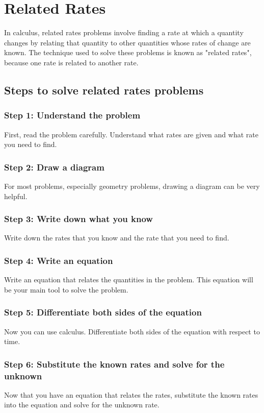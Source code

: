 \chapter{Related Rates}

In calculus, related rates problems involve finding a rate at which a quantity changes by relating that quantity to other quantities whose rates of change are known. The technique used to solve these problems is known as "related rates", because one rate is related to another rate.

\section{Steps to solve related rates problems}

\subsection{Step 1: Understand the problem}
First, read the problem carefully. Understand what rates are given and what rate you need to find.

\subsection{Step 2: Draw a diagram}
For most problems, especially geometry problems, drawing a diagram can be very helpful.

\subsection{Step 3: Write down what you know}
Write down the rates that you know and the rate that you need to find.

\subsection{Step 4: Write an equation}
Write an equation that relates the quantities in the problem. This equation will be your main tool to solve the problem.

\subsection{Step 5: Differentiate both sides of the equation}
Now you can use calculus. Differentiate both sides of the equation with respect to time.

\subsection{Step 6: Substitute the known rates and solve for the unknown}
Now that you have an equation that relates the rates, substitute the known rates into the equation and solve for the unknown rate.

